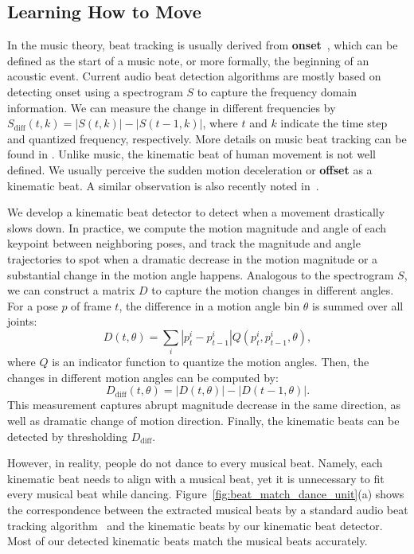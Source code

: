 \documentclass{article}
\newlength\secmargin
\newlength\subsecmargin
\begin{document}
\subsection{Learning How to Move}
\label{subsec:stage1}
\vspace{\subsecmargin}
In the music theory, beat tracking is usually derived from \textbf{onset}~\cite{ellis2007beat}, which can be defined as the start of a music note, or more formally, the beginning of an acoustic event. 
Current audio beat detection algorithms are mostly based on detecting onset using a spectrogram $S$ to capture the frequency domain information.
We can measure the change in different frequencies by $S_{\mathrm{diff}}(t,k) = |S(t,k)|-|S(t-1,k)|$, where $t$ and $k$ indicate the time step and quantized frequency, respectively.
More details on music beat tracking can be found in \cite{ellis2007beat}. Unlike music, the kinematic beat of human movement is not well defined.
We usually perceive the sudden motion deceleration or \textbf{offset} as a kinematic beat.
A similar observation is also recently noted in~\cite{davis2018visual}.


We develop a kinematic beat detector to detect when a movement drastically slows down.
In practice, we compute the motion magnitude and angle of each keypoint between neighboring poses, and track the magnitude and angle trajectories to spot when a dramatic decrease in the motion magnitude or a substantial change in the motion angle happens.
Analogous to the spectrogram $S$, we can construct a matrix $D$ to capture the motion changes in different angles.
For a pose $p$ of frame $t$, the difference in a motion angle bin $\theta$ is summed over all joints: 
\begin{equation}
    D(t, \theta) = \sum_{i} |p^i_t-p^i_{t-1}|Q(p^i_t,p^i_{t-1},\theta),
\end{equation}
where $Q$ is an indicator function to quantize the motion angles.
Then, the changes in different motion angles can be computed by:
\begin{equation}
    D_{\mathrm{diff}}(t,\theta) = |D(t,\theta)|-|D(t - 1,\theta)|.
\end{equation}
This measurement captures abrupt magnitude decrease in the same direction, as well as dramatic change of motion direction.
Finally, the kinematic beats can be detected by thresholding $D_{\mathrm{diff}}$.

However, in reality, people do not dance to every musical beat. 
Namely, each kinematic beat needs to align with a musical beat, yet it is unnecessary to fit every musical beat while dancing.
Figure~\ref{fig:beat_match_dance_unit}(a) shows the correspondence between the extracted musical beats by a standard audio beat tracking algorithm~\cite{ellis2007beat} and the kinematic beats by our kinematic beat detector. 
Most of our detected kinematic beats match the musical beats accurately.
\end{document}
